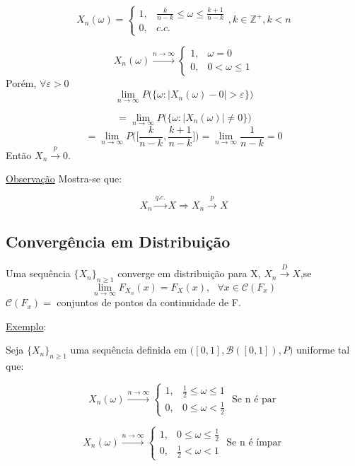 \documentclass[a4paper,12pt]{article}
\begin{document}
$$X_n(\omega)=
\begin{cases}
1, & \frac{k}{n-k}\le \omega \le \frac{k+1}{n-k}\\
0, & c.c.
\end{cases}, k\in \mathbb Z^+, k<n
 $$
 
 $$X_n(\omega)\overset{n\rightarrow \infty}{\longrightarrow}  \begin{cases}
 1, & \omega =0\\
 0, & 0<\omega \le 1
 \end{cases}$$ 
Porém, $\forall \varepsilon>0$
$$\lim\limits_{n\rightarrow \infty} P\bigg(
\{\omega : \bigg|X_n(\omega)-0\bigg| > \varepsilon\}
\bigg)  $$

$$= \lim\limits_{n\rightarrow \infty} P\bigg(
\{\omega : \bigg|X_n(\omega)\bigg| \ne 0 \}
\bigg)  $$
$$= \lim\limits_{n\rightarrow \infty} P\bigg(\bigg[
\frac{k}{n-k}, \frac{k+1}{n-k}
\bigg] \bigg) = \lim\limits_{n\rightarrow \infty}  \frac{1}{n-k}=0 $$
Então $X_n\overset{p}{\longrightarrow} 0$.

\underline{Observação} Mostra-se que:

$$ X_n\overset{q.c.}{\longrightarrow} X  \Rightarrow X_n\overset{p}{\longrightarrow}X $$
\newpage 
\subsection{Convergência em Distribuição}

Uma sequência $\{X_n\}_{ n \ge 1}$ converge em distribuição para X, $X_n\overset{D}{\longrightarrow} X$,se 
$$\lim\limits_{n\rightarrow \infty} F_{X_n}(x) = F_X(x), \ \ \ \forall x \in \mathscr C (F_x) $$
$\mathscr C (F_x)=$ conjuntos de pontos da continuidade de F.

\underline{Exemplo}:

Seja $\{X_n\}_{ n \ge 1}$ uma sequência definida  em $\bigg([0,1],\mathscr B([0,1]),P\bigg)$ uniforme tal que:

$$X_n(\omega)\overset{n\rightarrow \infty}{\longrightarrow}  \begin{cases}
1, & \frac{1}{2}\le \omega \le 1\\
0,&0\le \omega < \frac{1}{2}
\end{cases} \text{\ \ \ \ \ Se n é par }$$ 

$$X_n(\omega) \overset{n\rightarrow \infty}{\longrightarrow}  \begin{cases}
1, & 0\le \omega \le \frac{1}{2}\\
0,& \frac{1}{2} < \omega < 1
\end{cases} \text{\ \ \ \ \ Se n é ímpar }$$ 
\end{document}
